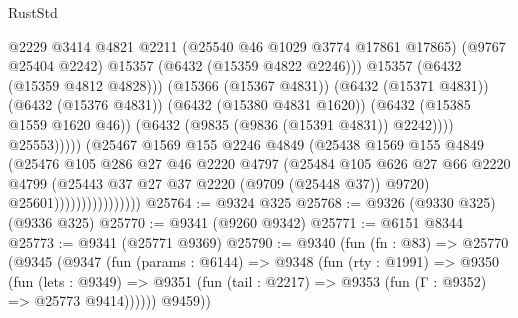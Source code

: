 \begin{lexlean}{RustStd}
\begin{coremodule}
                                              @2229
                                              @3414
                                              @4821
                                              @2211
                                              (@25540 @46 @1029 @3774 @17861 @17865)
                                              (@9767 @25404 @2242)
                                              @15357
                                              (@6432 (@15359 @4822 @2246)))
                                            @15357
                                            (@6432 (@15359 @4812 @4828)))
                                          (@15366 (@15367 @4831))
                                          (@6432 (@15371 @4831))
                                          (@6432 (@15376 @4831))
                                          (@6432 (@15380 @4831 @1620))
                                          (@6432 (@15385 @1559 @1620 @46))
                                          (@6432 (@9835 (@9836 (@15391 @4831)) @2242))))
                                      @25553)))))
                            (@25467
                              @1569
                              @155
                              @2246
                              @4849
                              (@25438
                                @1569
                                @155
                                @4849
                                (@25476
                                  @105
                                  @286
                                  @27
                                  @46
                                  @2220
                                  @4797
                                  (@25484
                                    @105
                                    @626
                                    @27
                                    @66
                                    @2220
                                    @4799
                                    (@25443 @37 @27 @37 @2220 (@9709 (@25448 @37)) @9720)
                                    @25601))))))))))))))))
@25764 := @9324 @325
@25768 := @9326 (@9330 @325) (@9336 @325)
@25770 := @9341 (@9260 @9342)
@25771 := @6151 @8344
@25773 := @9341 (@25771 @9369)
@25790 := @9340
    (fun (fn : @83) =>
    @25770
      (@9345
        (@9347
          (fun (params : @6144) =>
          @9348
            (fun (rty : @1991) =>
            @9350
              (fun (lets : @9349) =>
              @9351 (fun (tail : @2217) => @9353 (fun (Γ : @9352) => @25773 @9414))))))
        @9459))

\end{coremodule}
\end{lexlean}
